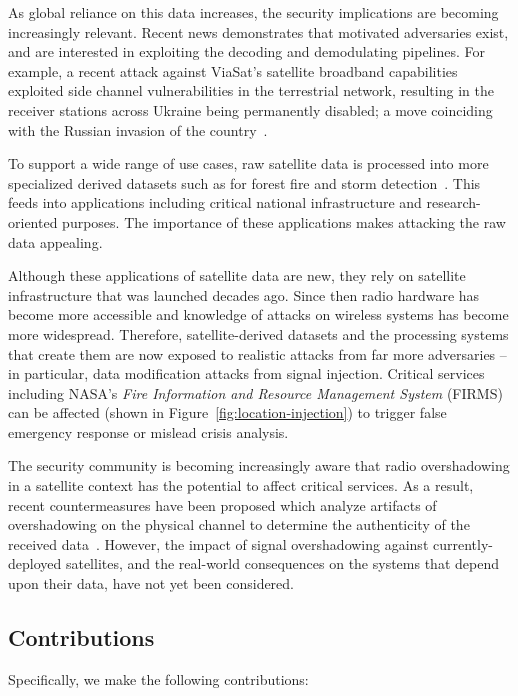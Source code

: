 As global reliance on this data increases, the security implications are becoming increasingly relevant.
Recent news demonstrates that motivated adversaries exist, and are interested in exploiting the decoding and demodulating pipelines.
For example, a recent attack against ViaSat's satellite broadband capabilities exploited side channel vulnerabilities in the terrestrial network, resulting in the receiver stations across Ukraine being permanently disabled; a move coinciding with the Russian invasion of the country~\cite{satcomAnalysis}.

To support a wide range of use cases, raw satellite data is processed into more specialized derived datasets such as for forest fire and storm detection~\cite{nasaFirms,sarikhani2021new}.
This feeds into applications including critical national infrastructure and research-oriented purposes.
The importance of these applications makes attacking the raw data appealing.

Although these applications of satellite data are new, they rely on satellite infrastructure that was launched decades ago.
Since then radio hardware has become more accessible and knowledge of attacks on wireless systems has become more widespread.
Therefore, satellite-derived datasets and the processing systems that create them are now exposed to realistic attacks from far more adversaries -- in particular, data modification attacks from signal injection.
Critical services including NASA's \textit{Fire Information and Resource Management System} (FIRMS) can be affected (shown in Figure~\ref{fig:location-injection}) to trigger false emergency response or mislead crisis analysis.

The security community is becoming increasingly aware that radio overshadowing in a satellite context has the potential to affect critical services.
As a result, recent countermeasures have been proposed which analyze artifacts of overshadowing on the physical channel to determine the authenticity of the received data~\cite{jedermann2021orbit,oligeri2020past}.
However, the impact of signal overshadowing against currently-deployed satellites, and the real-world consequences on the systems that depend upon their data, have not yet been considered.

\subsection{Contributions}

Specifically, we make the following contributions:

